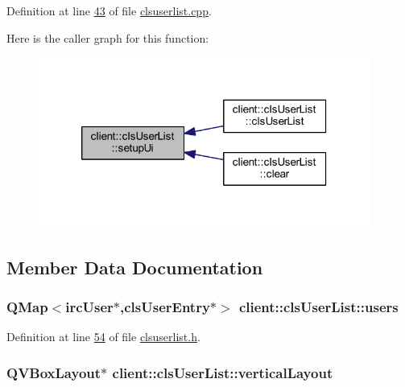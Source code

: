 Definition at line \hyperlink{clsuserlist_8cpp_source_l00043}{43} of file \hyperlink{clsuserlist_8cpp_source}{clsuserlist.\-cpp}.



Here is the caller graph for this function\-:
\nopagebreak
\begin{figure}[H]
\begin{center}
\leavevmode
\includegraphics[width=308pt]{de/dda/classclient_1_1cls_user_list_aca5601b1e79a265ddc203dbdf8c5c868_icgraph}
\end{center}
\end{figure}




\subsection{Member Data Documentation}
\hypertarget{classclient_1_1cls_user_list_a6d0e35cdea1d00a02c471a91b5a1aee6}{
\subsubsection[{users}]{\setlength{\rightskip}{0pt plus 5cm}Q\-Map$<${\bf irc\-User}$\ast$,{\bf cls\-User\-Entry}$\ast$$>$ client\-::cls\-User\-List\-::users\hspace{0.3cm}{\ttfamily [private]}}}\label{de/dda/classclient_1_1cls_user_list_a6d0e35cdea1d00a02c471a91b5a1aee6}


Definition at line \hyperlink{clsuserlist_8h_source_l00054}{54} of file \hyperlink{clsuserlist_8h_source}{clsuserlist.\-h}.

\hypertarget{classclient_1_1cls_user_list_a48eb4d8d6f5513d819b8342d7c95af20}{
\subsubsection[{vertical\-Layout}]{\setlength{\rightskip}{0pt plus 5cm}Q\-V\-Box\-Layout$\ast$ client\-::cls\-User\-List\-::vertical\-Layout\hspace{0.3cm}{\ttfamily [private]}}}\label{de/dda/classclient_1_1cls_user_list_a48eb4d8d6f5513d819b8342d7c95af20}



